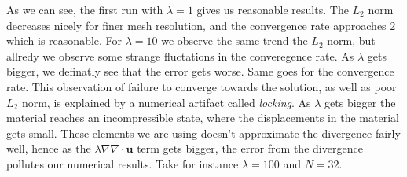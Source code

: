 \documentclass[a4paper,norsk]{article}
\begin{document}
As we can see, the first run with $\lambda = 1$ gives us reasonable results. The $L_2$ norm decreases nicely for finer mesh
resolution, and the convergence rate approaches 2 which is reasonable. For $\lambda = 10$ we observe the same trend the $L_2$ norm, but allredy we observe some strange fluctations in the converegence rate.
As $\lambda$ gets bigger, we definatly see that the error gets worse. Same goes for the convergence rate. This observation of failure to converge towards the solution, as well as poor $L_2$ norm, is explained by a numerical artifact called \textit{locking}. As $\lambda$ gets bigger the material reaches an
incompressible state, where the displacements in the material gets small.
These elements we are using doesn't approximate the divergence fairly well, hence as the
$\lambda \nabla \nabla \cdot \textbf{u}$ term gets bigger, the error from the divergence pollutes our numerical results. Take for
instance $\lambda = 100$ and $N = 32$.
\end{document}
